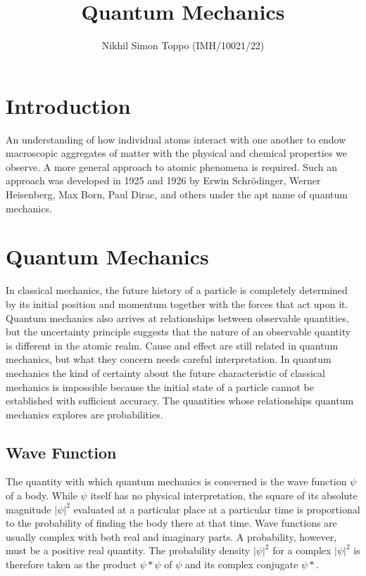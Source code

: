 \documentclass{article}
\title{Quantum Mechanics}
\author{Nikhil Simon Toppo (IMH/10021/22)}
\date{}
\begin{document}
\maketitle

\newpage

\section*{Introduction}

An understanding of how individual atoms interact with one another to endow macroscopic aggregates of matter with the
physical and chemical properties we observe.
A more general approach to atomic phenomena
is required. Such an approach was developed in 1925 and 1926 by Erwin Schrödinger,
Werner Heisenberg, Max Born, Paul Dirac, and others under the apt name of quantum
mechanics. 

\section{Quantum Mechanics}
In classical mechanics, the future history of a particle is completely determined by its initial position and momentum together with the
forces that act upon it. Quantum mechanics also arrives at relationships between observable quantities, but
the uncertainty principle suggests that the nature of an observable quantity is different in the atomic realm. Cause and effect are still related in quantum mechanics, but
what they concern needs careful interpretation. In quantum mechanics the kind of certainty about the future characteristic of classical mechanics is impossible because the
initial state of a particle cannot be established with sufficient accuracy. The quantities whose relationships quantum mechanics explores are probabilities.


\subsection{Wave Function} 

The quantity with which quantum mechanics is concerned is the wave function $\psi$ of a body. While $\psi$ itself has no physical interpretation, the
square of its absolute magnitude $|\psi|^2$ 
evaluated at a particular place at a particular time
is proportional to the probability of finding the body there at that time.\vspace{10pt}
Wave functions are usually complex with both real and imaginary parts. A probability, however, must be a positive real quantity. The probability density $|\psi|^2$
for a complex $|\psi|^2$ is therefore taken as the product $\psi*\psi$ of $\psi$ and its complex conjugate $\psi*$. 
\end{document}
